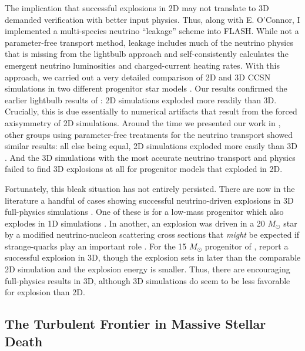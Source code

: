 The implication that successful explosions in 2D may not translate to 3D demanded verification with better input physics.
Thus, along with E. O'Connor, I implemented a multi-species neutrino ``leakage'' scheme \citep{OConnor:2010} into FLASH.
While not a parameter-free transport method, leakage includes much of the neutrino physics that is missing from the lightbulb approach and self-consistently calculates the emergent neutrino luminosities and charged-current heating rates.
With this approach, we carried out a very detailed comparison of 2D and 3D CCSN simulations in two different progenitor star models \citep{Couch:2014}.
Our results confirmed the earlier lightbulb results of \citet{Hanke:2012, Couch:2013a}: 2D simulations exploded more readily than 3D.
Crucially, this is due essentially to numerical artifacts that result from the forced axisymmetry of 2D simulations.
Around the time we presented our work in \citet{Couch:2014}, other groups using parameter-free treatments for the neutrino transport showed similar results: all else being equal, 2D simulations exploded more easily than 3D \citep{Hanke:2013, Tamborra:2014, Takiwaki:2014}.
And the 3D simulations with the most accurate neutrino transport and physics \citep{Hanke:2013, Tamborra:2014} failed to find 3D explosions at all for progenitor models that exploded in 2D.

Fortunately, this bleak situation has not entirely persisted.
There are now in the literature a handful of cases showing successful neutrino-driven explosions in 3D full-physics simulations \citep{Melson:2015, Melson:2015a, Lentz:2015}.
One of these is for a low-mass progenitor which also explodes in 1D simulations \citep{Melson:2015}.
In another, an explosion was driven in a 20 $M_\odot$ star by a modified neutrino-nucleon scattering cross sections that {\it might} be expected if strange-quarks play an important role \citep{Melson:2015a}.
For the 15 $M_\odot$ progenitor of \citet{Woosley:2007d}, \citet{Lentz:2015} report a successful explosion in 3D, though the explosion sets in later than the comparable 2D simulation and the explosion energy is smaller.
Thus, there are encouraging full-physics results in 3D, although 3D simulations do seem to be less favorable for explosion than 2D.

\subsection{The Turbulent Frontier in Massive Stellar Death}

